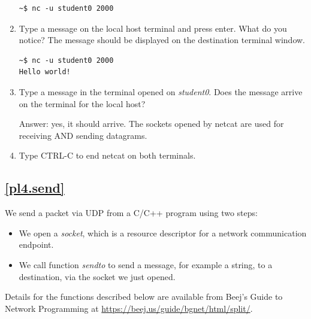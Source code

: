 \documentclass[12pt]{book}
\begin{document}
\begin{enumerate}[label=Activity \arabic*:]
  \begin{lstlisting}
~$ nc -u student0 2000
  \end{lstlisting}

\item Type a message on the local host terminal and press enter. What do you notice? The message should be displayed on the destination terminal window.

  \begin{lstlisting}
~$ nc -u student0 2000
Hello world!
  \end{lstlisting}

\item Type a message in the terminal opened on \emph{student0}. Does the message arrive on the terminal for the local host?

  Answer: yes, it should arrive. The sockets opened by netcat are used for receiving AND sending datagrams.
  
  \item Type CTRL-C to end netcat on both terminals.

\end{enumerate}


\subsection{\ref{pl4.send}}

We send a packet via UDP from a C/C++ program using two steps:
\begin{itemize}[label=--]
\item We open a \emph{socket}, which is a resource descriptor for a network communication endpoint.
  \item We call function \emph{sendto} to send a message, for example a string, to a destination, via the socket we just opened.
\end{itemize}
Details for the functions described below are available from Beej's Guide to Network Programming at \url{https://beej.us/guide/bgnet/html/split/}.
\end{document}
